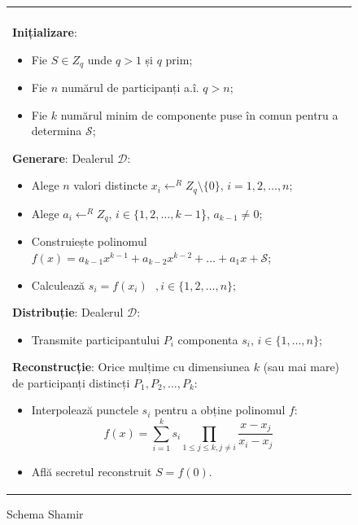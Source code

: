 \documentclass[oneside, 12pt]{book}
\begin{document}
\begin{figure}[h!]

\begin{tabular}{|p{\textwidth}|}
\hline

\\
\hspace{.1in}
\textbf{Inițializare}: 
	\begin{itemize}
		\item Fie $S \in Z_q$ unde $q > 1 $ și $q$ prim;
		\item Fie $n$ numărul de participanți a.î. $q > n$;
		\item Fie $k$ numărul minim de componente puse în comun pentru a determina $\mathcal{S}$;
	\end{itemize}
\medskip

\hspace{.1in}
\textbf{Generare}: Dealerul $\mathcal{D}$:
	\begin{itemize}
		\item Alege $n$ valori distincte $x_i \leftarrow^R Z_q \setminus \{0\} \text{, }i = 1,2,\dots, n$;
		\item Alege $a_{i} \leftarrow^R Z_q \text{, }i \in \{1,2,\dots,{k - 1}$\}, $a_{k-1} \neq 0$;
		\item Construiește polinomul $f(x) = a_{k - 1}x ^ {k-1} + a_{k-2}x ^ {k - 2} + \dots + a_1x + \mathcal{S}$;
		\item Calculează $s_i = f(x_i) \text{ }, i \in \{1,2,\dots,n\}$;
	\end{itemize}
\medskip

\hspace{.1in}
\textbf{Distribuție}: Dealerul $\mathcal{D}$:
	\begin{itemize}
		\item Transmite participantului $P_i$ componenta $s_i$, $i \in \{1,\dots,n\}$;
	\end{itemize}

\hspace{.1in}
\textbf{Reconstrucție}: Orice mulțime cu dimensiunea $k$ (sau mai mare) de participanți distincți $P_1, P_2, \dots, P_k$:
	\begin{itemize}
		\setlength{\itemsep}{5pt}
		\item Interpolează punctele $s_i$ pentru a obține polinomul $f$:
		\begin{equation} f(x)=\sum_{i=1}^{k} {s_i}\prod_{1 \leq j \leq k, j \neq i} \frac{x-x_j}{x_i-x_j} \end{equation}
		\item Află secretul reconstruit $S = f(0)$.
	\end{itemize}

\\
\hline
\end{tabular}

\caption{Schema Shamir \cite{S:1979}}
\label{fig:shamir_scheme}
\end{figure}
\end{document}
